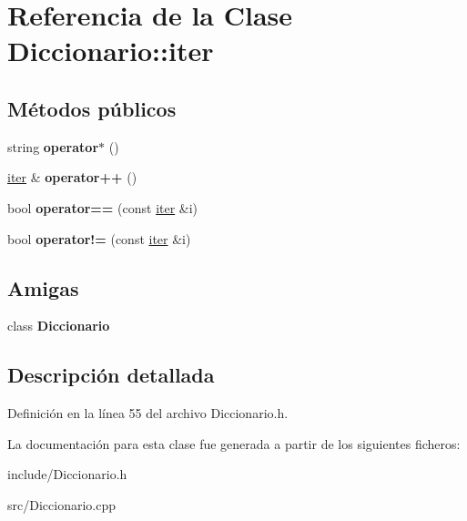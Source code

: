 \hypertarget{classDiccionario_1_1iter}{}\section{Referencia de la Clase Diccionario\+:\+:iter}
\label{classDiccionario_1_1iter}
\subsection*{Métodos públicos}
\begin{DoxyCompactItemize}
\item 
string {\bfseries operator$\ast$} ()\hypertarget{classDiccionario_1_1iter_a6af7a0c96a2306418a1dd6440dd59637}{}\label{classDiccionario_1_1iter_a6af7a0c96a2306418a1dd6440dd59637}

\item 
\hyperlink{classDiccionario_1_1iter}{iter} \& {\bfseries operator++} ()\hypertarget{classDiccionario_1_1iter_af4c17c367ede4317ea2628d3ac80ad0f}{}\label{classDiccionario_1_1iter_af4c17c367ede4317ea2628d3ac80ad0f}

\item 
bool {\bfseries operator==} (const \hyperlink{classDiccionario_1_1iter}{iter} \&i)\hypertarget{classDiccionario_1_1iter_a0c66656f91fc8dd2bb30ac2933b115d2}{}\label{classDiccionario_1_1iter_a0c66656f91fc8dd2bb30ac2933b115d2}

\item 
bool {\bfseries operator!=} (const \hyperlink{classDiccionario_1_1iter}{iter} \&i)\hypertarget{classDiccionario_1_1iter_a2afe32e79fd067a67e14b2769ae2fc26}{}\label{classDiccionario_1_1iter_a2afe32e79fd067a67e14b2769ae2fc26}

\end{DoxyCompactItemize}
\subsection*{Amigas}
\begin{DoxyCompactItemize}
\item 
class {\bfseries Diccionario}\hypertarget{classDiccionario_1_1iter_ad36be158dde0129b4e0d03d0e454a26b}{}\label{classDiccionario_1_1iter_ad36be158dde0129b4e0d03d0e454a26b}

\end{DoxyCompactItemize}


\subsection{Descripción detallada}


Definición en la línea 55 del archivo Diccionario.\+h.



La documentación para esta clase fue generada a partir de los siguientes ficheros\+:\begin{DoxyCompactItemize}
\item 
include/Diccionario.\+h\item 
src/Diccionario.\+cpp\end{DoxyCompactItemize}
